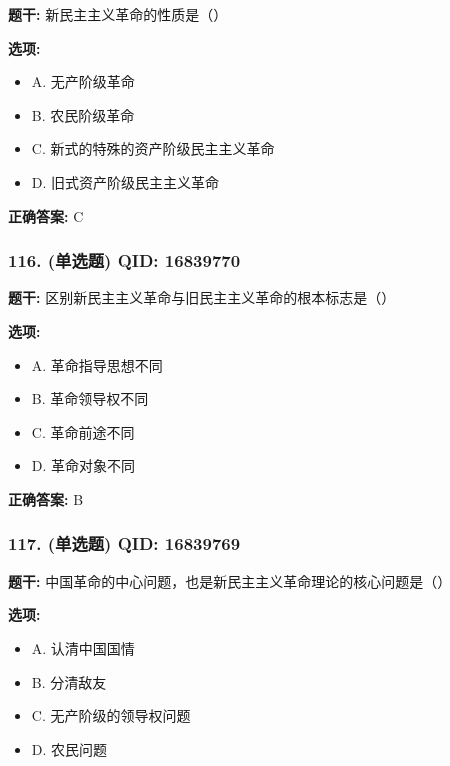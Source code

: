 \documentclass[12pt,UTF8]{ctexart}
\begin{document}
\textbf{题干:}
新民主主义革命的性质是（）

\textbf{选项:}
\begin{itemize}[leftmargin=*]

  \item A. 无产阶级革命

  \item B. 农民阶级革命

  \item C. 新式的特殊的资产阶级民主主义革命

  \item D. 旧式资产阶级民主主义革命

\end{itemize}

\textbf{正确答案:}
C

\vspace{0.3em}\hrulefill\vspace{0.7em}

\subsubsection*{116. (单选题) \small QID: 16839770}

\textbf{题干:}
区别新民主主义革命与旧民主主义革命的根本标志是（）

\textbf{选项:}
\begin{itemize}[leftmargin=*]

  \item A. 革命指导思想不同

  \item B. 革命领导权不同

  \item C. 革命前途不同

  \item D. 革命对象不同

\end{itemize}

\textbf{正确答案:}
B

\vspace{0.3em}\hrulefill\vspace{0.7em}

\subsubsection*{117. (单选题) \small QID: 16839769}

\textbf{题干:}
中国革命的中心问题，也是新民主主义革命理论的核心问题是（）

\textbf{选项:}
\begin{itemize}[leftmargin=*]

  \item A. 认清中国国情

  \item B. 分清敌友

  \item C. 无产阶级的领导权问题

  \item D. 农民问题

\end{itemize}
\end{document}
